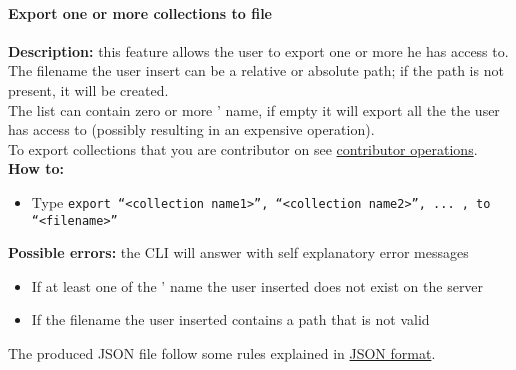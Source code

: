 \documentclass{scalatekids-article}
\begin{document}
\paragraph{Export one or more collections to file}
\label{sec:export}
\textbf{Description:} this feature allows the user to export one or more  he has access to.\\
The filename the user insert can be a relative or absolute path; if the path is not present, it will be created.\\
The  list can contain zero or more ' name, if empty it will export 
all the  the user has access to (possibly resulting in an expensive operation).\\
To export collections that you are contributor on see \hyperref[sec:contributoroperations]{contributor operations}.\\
\textbf{How to:}
\begin{itemize}
\item Type \texttt{export ``<collection name1>'', ``<collection name2>'', ... , to ``<filename>''}
\end{itemize}
\textbf{Possible errors:} the CLI will answer with self explanatory error messages
\begin{itemize}
\item If at least one of the ' name the user inserted does not exist on the server
\item If the filename the user inserted contains a path that is not valid
\end{itemize}

The produced JSON file follow some rules explained in \hyperref[sec:JSONFormat]{JSON format}.
\end{document}
